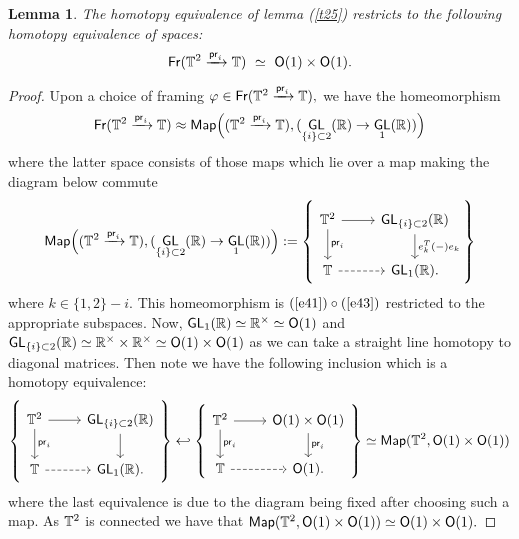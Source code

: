 \documentclass{amsart}
\newtheorem{lemma}[theorem]{Lemma}
\theoremstyle{definition}
\theoremstyle{remark}
\DeclareMathOperator{\pr}{\mathsf{pr}}
\newcommand{\xra}{\xrightarrow}
\DeclareMathOperator{\GL}{\sf GL}
\DeclareMathOperator{\Fr}{\sf Fr}
\begin{document}
\begin{lemma} \label{prfr}
The homotopy equivalence of lemma (\ref{t25}) restricts to the following homotopy equivalence of spaces:
\begin{equation} \label{e801}
\Fr(\TT^2 \xra{\pr_i} \TT)
~\simeq~
{\sf O}(1) \times {\sf O}(1). 
\end{equation}
\end{lemma}
\begin{proof}
Upon a choice of framing $\varphi \in \Fr(\TT^2 \xra{\pr_i} \TT),$ we have the homeomorphism 
\[
\Fr(\TT^2 \xra{\pr_i} \TT) \approx {\sf Map}\Big( (\TT^2 \xra{\pr_i} \TT), (\GL_{\{i\}\subset 2}(\RR) \rightarrow \GL_{1}(\RR)) \Big)
\]
where the latter space consists of those maps which lie over a map making the diagram below commute
\[ {\sf Map}\Big( (\TT^2 \xra{\pr_i} \TT), (\GL_{\{i\}\subset 2}(\RR) \rightarrow \GL_{1}(\RR)) \Big) :=
\left\{ \begin{tikzcd}
\TT^{2} \arrow[r] \arrow[d,"\pr_{i}"]
&
\GL_{\{i\}\subset 2}(\RR) \arrow[d, "e_{k}^{T}(-)e_{k}"]
\\
\TT \arrow[dashed, r]
&
\GL_{1}(\RR).
\end{tikzcd} \right\}
\]
where $k \in \{1, 2\} - i.$ This homeomorphism is $(\ref{e41}) \circ (\ref{e43})$ restricted to the appropriate subspaces.
Now, $\GL_{1}(\RR) \simeq \RR^{\times} \simeq {\sf O}(1)$ and $\GL_{\{i\}\subset 2}(\RR) \simeq \RR^{\times} \times \RR^{\times} \simeq {\sf O}(1) \times {\sf O}(1)$ as we can take a straight line homotopy to diagonal matrices. Then note we have the following inclusion which is a homotopy equivalence:
\[
\left\{ \begin{tikzcd}
\TT^{2} \arrow[r] \arrow[d,"\pr_{i}"]
&
\GL_{\{i\}\subset 2}(\RR) \arrow[d, ""]
\\
\TT \arrow[dashed, r]
&
\GL_{1}(\RR).
\end{tikzcd} \right\}
\hookleftarrow
\left\{ \begin{tikzcd}
\TT^{2} \arrow[r] \arrow[d,"\pr_{i}"]
&
{\sf O}(1) \times {\sf O}(1) \arrow[d, "\pr_{i}"]
\\
\TT \arrow[dashed, r]
&
{\sf O}(1).
\end{tikzcd} \right\} \simeq {\sf Map}(\TT^{2}, {\sf O}(1) \times {\sf O}(1))
\]
where the last equivalence is due to the diagram being fixed after choosing such a map. As $\mathbb T^{2}$ is connected we have that ${\sf Map}(\mathbb T^{2}, {\sf O}(1) \times {\sf O}(1)) \simeq {\sf O}(1) \times {\sf O}(1).$
\end{proof}
\end{document}
